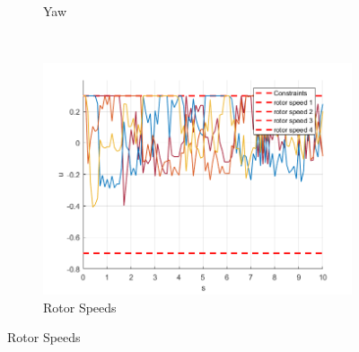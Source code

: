 \documentclass[11pt]{article}
\begin{document}
\begin{enumerate}
\begin{figure}[ht]
\begin{subfigure}[c]{0.3\linewidth}
            \caption{Yaw}
        \end{subfigure}
        ~
        \begin{subfigure}[c]{0.3\linewidth}
            \centering
            \includegraphics[width=\linewidth]{Plots_10_OffsetFreeTracking_Varying/03}
            \caption{Rotor Speeds}
        \end{subfigure}


\end{figure}
\end{enumerate}
\end{document}
